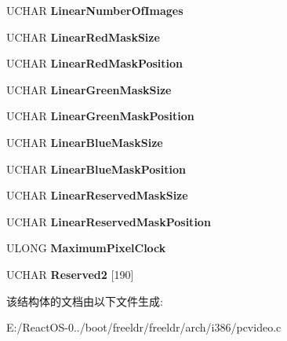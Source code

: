 \begin{DoxyCompactItemize}
\mbox{\label{struct_s_v_g_a___m_o_d_e___i_n_f_o_r_m_a_t_i_o_n_aec35846be0764fb0a48a57f570488c4f}} 
U\+C\+H\+AR {\bfseries Linear\+Number\+Of\+Images}
\item 
\mbox{\label{struct_s_v_g_a___m_o_d_e___i_n_f_o_r_m_a_t_i_o_n_a0b1a775ec02398247872832f93fd7843}} 
U\+C\+H\+AR {\bfseries Linear\+Red\+Mask\+Size}
\item 
\mbox{\label{struct_s_v_g_a___m_o_d_e___i_n_f_o_r_m_a_t_i_o_n_ac90a0d3bc3330a419b0505b62c111c92}} 
U\+C\+H\+AR {\bfseries Linear\+Red\+Mask\+Position}
\item 
\mbox{\label{struct_s_v_g_a___m_o_d_e___i_n_f_o_r_m_a_t_i_o_n_aa998e28df6374d4c5462f57850423455}} 
U\+C\+H\+AR {\bfseries Linear\+Green\+Mask\+Size}
\item 
\mbox{\label{struct_s_v_g_a___m_o_d_e___i_n_f_o_r_m_a_t_i_o_n_ae782fd9048f8d13123591f1a3c6001ae}} 
U\+C\+H\+AR {\bfseries Linear\+Green\+Mask\+Position}
\item 
\mbox{\label{struct_s_v_g_a___m_o_d_e___i_n_f_o_r_m_a_t_i_o_n_a6d5fd3836404a3ecf85853c862210126}} 
U\+C\+H\+AR {\bfseries Linear\+Blue\+Mask\+Size}
\item 
\mbox{\label{struct_s_v_g_a___m_o_d_e___i_n_f_o_r_m_a_t_i_o_n_a6765cb1051b2f60f63c0fcb2f9a0e959}} 
U\+C\+H\+AR {\bfseries Linear\+Blue\+Mask\+Position}
\item 
\mbox{\label{struct_s_v_g_a___m_o_d_e___i_n_f_o_r_m_a_t_i_o_n_ae9c2a42a017d9099f57332b4069f1264}} 
U\+C\+H\+AR {\bfseries Linear\+Reserved\+Mask\+Size}
\item 
\mbox{\label{struct_s_v_g_a___m_o_d_e___i_n_f_o_r_m_a_t_i_o_n_aa714831aff6718eaab49d283dc44b072}} 
U\+C\+H\+AR {\bfseries Linear\+Reserved\+Mask\+Position}
\item 
\mbox{\label{struct_s_v_g_a___m_o_d_e___i_n_f_o_r_m_a_t_i_o_n_a7895b1082c076907a8a2ea63c35fb369}} 
U\+L\+O\+NG {\bfseries Maximum\+Pixel\+Clock}
\item 
\mbox{\label{struct_s_v_g_a___m_o_d_e___i_n_f_o_r_m_a_t_i_o_n_acf8efb06443681c5ac2ca08ab1aedc36}} 
U\+C\+H\+AR {\bfseries Reserved2} \mbox{[}190\mbox{]}
\end{DoxyCompactItemize}


该结构体的文档由以下文件生成\+:\begin{DoxyCompactItemize}
\item 
E\+:/\+React\+O\+S-\/0../boot/freeldr/freeldr/arch/i386/pcvideo.\+c\end{DoxyCompactItemize}
